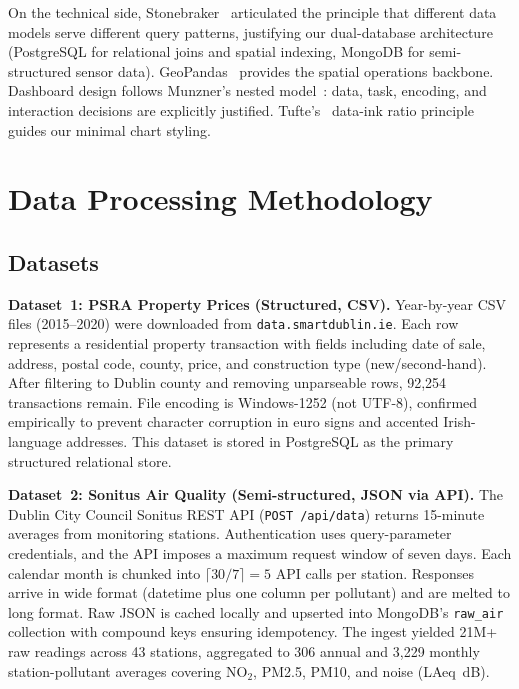 \documentclass[conference]{IEEEtran}
\begin{document}
On the technical side, Stonebraker~\cite{stonebraker2010} articulated the
principle that different data models serve different query patterns, justifying
our dual-database architecture (PostgreSQL for relational joins and spatial
indexing, MongoDB for semi-structured sensor data). GeoPandas~\cite{jordahl2014}
provides the spatial operations backbone. Dashboard design follows Munzner's
nested model~\cite{munzner2014}: data, task, encoding, and interaction decisions
are explicitly justified. Tufte's~\cite{tufte1983} data-ink ratio principle
guides our minimal chart styling.

\section{Data Processing Methodology}
\label{sec:method}

\subsection{Datasets}

\textbf{Dataset~1: PSRA Property Prices (Structured, CSV).}
Year-by-year CSV files (2015--2020) were downloaded from
\texttt{data.smartdublin.ie}. Each row represents a residential property
transaction with fields including date of sale, address, postal code, county,
price, and construction type (new/second-hand). After filtering to Dublin
county and removing unparseable rows, 92{,}254 transactions remain. File
encoding is Windows-1252 (not UTF-8), confirmed empirically to prevent
character corruption in euro signs and accented Irish-language addresses.
This dataset is stored in PostgreSQL as the primary structured relational
store.

\textbf{Dataset~2: Sonitus Air Quality (Semi-structured, JSON via API).}
The Dublin City Council Sonitus REST API (\texttt{POST /api/data}) returns
15-minute averages from monitoring stations. Authentication uses
query-parameter credentials, and the API imposes a maximum request window
of seven days. Each calendar month is chunked into
$\lceil 30/7 \rceil = 5$ API calls per station. Responses arrive in
wide format (datetime plus one column per pollutant) and are melted to
long format. Raw JSON is cached locally and upserted into MongoDB's
\texttt{raw\_air} collection with compound keys ensuring idempotency.
The ingest yielded 21M+ raw readings across 43 stations, aggregated to
306 annual and 3{,}229 monthly station-pollutant averages covering NO$_2$,
PM2.5, PM10, and noise (LAeq~dB).
\end{document}
